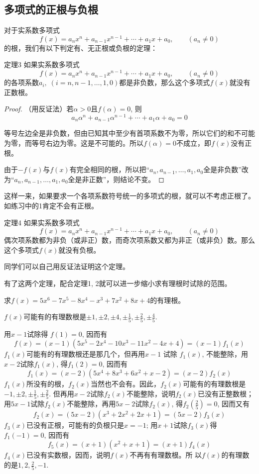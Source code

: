 \subsection{多项式的正根与负根}

对于实系数多项式
\[f(x)=a_nx^n+a_{n-1}x^{n-1}+\cdots+a_1x+a_0,\qquad (a_n\ne 0)\]
的根，我们有以下判定有、无正根或负根的定理：

\begin{blk}{定理3}
    如果实系数多项式
    \[f(x)=a_nx^n+a_{n-1}x^{n-1}+\cdots+a_1x+a_0,\qquad (a_n\ne 0)\]
    的各项系数$a_i,\; (i=n,n-1,\ldots,1, 0)$都是非负数，那么这个多项式$f(x)$就没有正数根。
\end{blk}

\begin{proof}
（用反证法）若$\alpha>0$且$f(\alpha)=0$, 则
\[a_n\alpha^n+a_{n-1}\alpha^{n-1}+\cdots+a_1\alpha+a_0=0\]

等号左边全是非负数，但由已知其中至少有首项系数不为零，所以它们的和不可能为零，而等号右边为零。这是不可能的。所以$f(\alpha)=0$不成立，即$f(x)$没有正根。

由于$-f(x)$与$f(x)$有完全相同的根，所以把“$a_n,a_{n-1},\ldots,a_1,a_0$全是非负数”改为“$a_n,a_{n-1},\ldots,a_1,a_0$全是非正数”，则结论不变。
\end{proof}

这样一来，如果要求一个各项系数符号统一的多项式的根，就可以不考虑正根了。如练习中的1肯定不会有正根。

\begin{blk}{定理4}
     如果实系数多项式
 \[f(x)=a_nx^n+a_{n-1}x^{n-1}+\cdots+a_1x+a_0,\qquad (a_n\ne 0)\]
偶次项系数都为非负（或非正）数，而奇次项系数又都为非正（或非负）数。那么这个多项式$f(x)$就没有负根。
\end{blk}

同学们可以自己用反证法证明这个定理。

有了这两个定理，配合定理1, 2就可以进一步缩小求有理根时试除的范围。

\begin{example}
    求$f(x)=5x^6-7x^5-8x^4-x^3+7x^2+8x+4$的有理根。
\end{example}

\begin{solution}
$f(x)$可能有的有理数根是$\pm 1,\pm 2,\pm 4,\pm \frac{1}{5},
\pm \frac{2}{5}, \pm \frac{4}{5}$.

用$x-1$试除得 $f(1)=0$, 因而有
\[f (x) = (x-1) (5x^5-2x^4-10x^3-11x^2-4x+4)=(x-1) f_1(x)\]
$f_1(x)$可能有的有理数根还是那几个，但再用$x-1$ 试除
$f_1(x)$, 不能整除，用$x-2$试除$f_1(x)$, 得$f_1(2)=0$, 因而有
\[f_1 (x) = (x-2) (5x^4+8x^3+6x^2+x-2)=(x-2)f_2(x)\]
$f_1(x)$所没有的根，$f_2(x)$当然也不会有。因此，$f_2(x)$可能有的有理数根是$-1,\pm 2,\pm \frac{1}{5},\pm \frac{2}{5}$. 但再用$x-2$试除$f_2(x)$不能整除，说明$f_2(x)$已没有正整数根；用$5x-1$试除$f_2(x)$不能整除，再用$5x-2$试除$f_2(x)$, 得$f_2\left(\frac{2}{5}\right)=0$, 
因而又有
\[f_2 (x) = (5x-2) (x^3+2x^2+2x+1)=(5x-2)f_3(x)\]
$f_3(x)$已没有正根，可能有的负根只是$x=-1$; 用$x+1$试除$f_3(x)$得$f_1(-1)=0$, 因而有
\[f_5 (x) = (x+1) (x^2+x+1)=(x+1)f_4(x)\]
$f_4(x)$已没有实数根，因而，说明$f(x)$不再有有理数根。所
以$f(x)$的有理数的是$1, 2,\frac{2}{5},-1$.
\end{solution}

